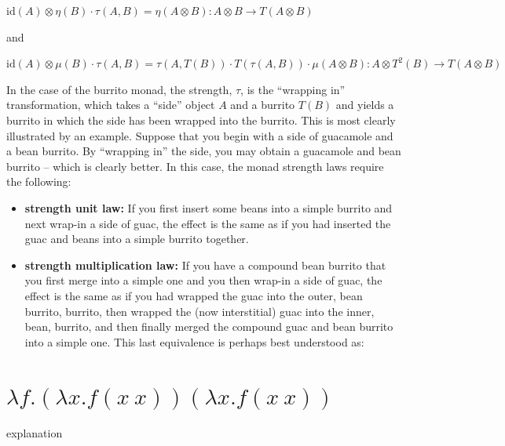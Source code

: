 \documentclass[10pt,twoside,openleft]{memoir}
\begin{document}
\begin{center}
 $\textrm{id}(A) \otimes \eta(B) \cdot \tau(A, B) = \eta(A \otimes B) : A \otimes B \rightarrow T(A \otimes B)$
\end{center}

\noindent and

\begin{center}
 $\textrm{id}(A) \otimes \mu(B) \cdot \tau(A,B) = \tau(A,T(B)) \cdot T(\tau(A,B)) \cdot \mu(A \otimes B) : A \otimes T^2(B) \rightarrow T(A \otimes B)$
\end{center}

In the case of the burrito monad, the strength, $\tau$, is the ``wrapping in''
transformation, which takes a ``side'' object $A$ and a burrito $T(B)$ and yields a
burrito in which the side has been wrapped into the burrito. This is most clearly
illustrated by an example. Suppose that you begin with a side of guacamole
and a bean burrito. By ``wrapping in'' the side, you may obtain a guacamole
and bean burrito -- which is clearly better. In this case, the monad strength
laws require the following:

\begin{itemize}
 \item[] \textbf{strength unit law:} If you first insert some beans into a simple burrito and
next wrap-in a side of guac, the effect is the same as if you had inserted
the guac and beans into a simple burrito together.
 \item[] \textbf{strength multiplication law:} If you have a compound bean burrito that you
first merge into a simple one and you then wrap-in a side of guac, the effect
is the same as if you had wrapped the guac into the outer, bean burrito,
burrito, then wrapped the (now interstitial) guac into the inner, bean,
burrito, and then finally merged the compound guac and bean burrito into a simple one. This last equivalence is perhaps best understood as:
\end{itemize}


\chapter{$\lambda f . (\lambda x . f(x~x)) (\lambda x. f(x~x))$}

explanation
\end{document}
